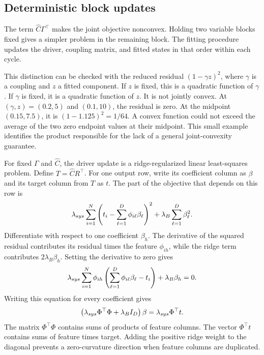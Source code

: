 \subsection{Deterministic block updates}

The term \(\widehat C\Gamma^\top\) makes the joint objective nonconvex. Holding two variable blocks fixed gives a simpler problem in the remaining block. The fitting procedure updates the driver, coupling matrix, and fitted states in that order within each cycle.

This distinction can be checked with the reduced residual \((1-\gamma z)^2\), where \(\gamma\) is a coupling and \(z\) a fitted component. If \(z\) is fixed, this is a quadratic function of \(\gamma\). If \(\gamma\) is fixed, it is a quadratic function of \(z\). It is not jointly convex. At \((\gamma,z)=(0.2,5)\) and \((0.1,10)\), the residual is zero. At the midpoint \((0.15,7.5)\), it is \((1-1.125)^2=1/64\). A convex function could not exceed the average of the two zero endpoint values at their midpoint. This small example identifies the product responsible for the lack of a general joint-convexity guarantee.

For fixed \(\Gamma\) and \(\widehat C\), the driver update is a ridge-regularized linear least-squares problem. Define \(T=\widehat C R^\top\). For one output row, write its coefficient column as \(\beta\) and its target column from \(T\) as \(t\). The part of the objective that depends on this row is
\begin{equation}
\equationname{Regularized least-squares objective for one driver coefficient row}
\label{eq:icsor_ridge_row_objective}
\lambda_{sys}\sum_{i=1}^{N}
\left(t_i-\sum_{\ell=1}^{D}\phi_{i\ell}\beta_\ell\right)^2
+\lambda_B\sum_{\ell=1}^{D}\beta_\ell^2.
\end{equation}
Differentiate with respect to one coefficient \(\beta_h\). The derivative of the squared residual contributes its residual times the feature \(\phi_{ih}\), while the ridge term contributes \(2\lambda_B\beta_h\). Setting the derivative to zero gives
\begin{equation}
\equationname{Scalar stationarity conditions for a driver coefficient row}
\label{eq:icsor_ridge_scalar_normal}
\lambda_{sys}\sum_{i=1}^{N}\phi_{ih}
\left(\sum_{\ell=1}^{D}\phi_{i\ell}\beta_\ell-t_i\right)
+\lambda_B\beta_h=0.
\end{equation}
Writing this equation for every coefficient gives
\begin{equation}
\equationname{Normal equations for the driver coefficient row}
\label{eq:icsor_ridge_normal_equations}
\left(\lambda_{sys}\Phi^\top\Phi+\lambda_BI_D\right)\beta
=\lambda_{sys}\Phi^\top t.
\end{equation}
The matrix \(\Phi^\top\Phi\) contains sums of products of feature columns. The vector \(\Phi^\top t\) contains sums of feature times target. Adding the positive ridge weight to the diagonal prevents a zero-curvature direction when feature columns are duplicated.

